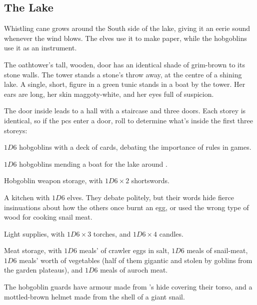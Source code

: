 \begin{multicols}{2}

\subsection{The Lake}

\noindent
Whistling cane grows around the South side of the lake, giving it an eerie sound whenever the wind blows.%
The elves use it to make paper, while the hobgoblins use it as an instrument.

\begin{boxtext}
  The \gls{oathtower}'s tall, wooden, door has an identical shade of grim-brown to its stone walls.
  The tower stands a stone's throw away, at the centre of a shining lake.
  A single, short, figure in a green tunic stands in a boat by the tower.
  Her ears are long, her skin maggoty-white, and her eyes full of suspicion.
\end{boxtext}


The door inside leads to a hall with a staircase and three doors.
Each storey is identical, so if the \glspl{pc} enter a door, roll to determine what's inside the first three storeys:

\begin{dlist}
  \item
  $1D6$ hobgoblins with a deck of cards, debating the importance of rules in games.
  \item
  $1D6$ hobgoblins mending a boat for the lake around .
  \item
  Hobgoblin weapon storage, with $1D6 \times 2$ shortswords.
  \item
  A kitchen with $1D6$ elves.
  They debate politely, but their words hide fierce insinuations about how the others once burnt an egg, or used the wrong type of wood for cooking snail meat.
  \item
  Light supplies, with $1D6 \times 3$ torches, and $1D6 \times 4$ candles.
  \item
  Meat storage, with $1D6$ meals' of \gls{crawler} eggs in salt, $1D6$ meals of snail-meat, $1D6$ meals' worth of vegetables (half of them gigantic and stolen by goblins from the garden plateaus), and $1D6$ meals of auroch meat.
\end{dlist}

\hobgoblin

The hobgoblin guards have \gls{armour} made from 's hide \gls{covering} their torso, and a mottled-brown helmet made from the shell of a giant snail.


\end{multicols}
